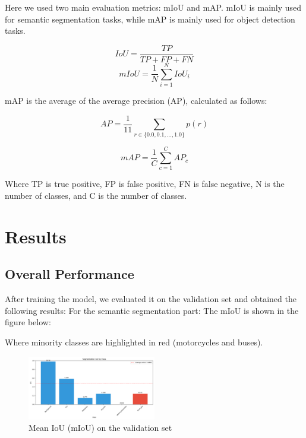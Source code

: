 \documentclass[conference]{IEEEtran}
\begin{document}
Here we used two main evaluation metrics: mIoU and mAP. mIoU is mainly used for semantic segmentation tasks, while mAP is mainly used for object detection tasks.

\[IoU = \frac{TP}{TP + FP + FN}\]
\[mIoU = \frac{1}{N} \sum_{i=1}^{N} IoU_i\]


mAP is the average of the average precision (AP), calculated as follows:

\[AP = \frac{1}{11} \sum_{r \in \{0.0, 0.1, \ldots, 1.0\}} p(r)\]

\[mAP = \frac{1}{C} \sum_{c=1}^{C} AP_c\]


Where TP is true positive, FP is false positive, FN is false negative, N is the number of classes, and C is the number of classes.

\section{Results}





\subsection{Overall Performance}


After training the model, we evaluated it on the validation set and obtained the following results:
For the semantic segmentation part:
The mIoU is shown in the figure below:


Where minority classes are highlighted in red (motorcycles and buses).


\begin{figure}[htbp]
    \centerline{\includegraphics[width=0.5\textwidth]{matrials/class_performance.png}}
    \caption{Mean IoU (mIoU) on the validation set}
    \label{fig:miou}
\end{figure}
\end{document}
